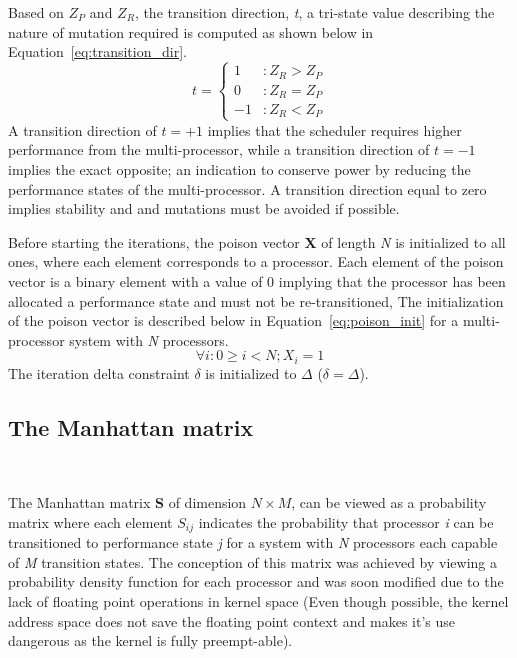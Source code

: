 Based on $Z_{P}$ and $Z_{R}$, the transition direction, \textit{t}, a tri-state value describing the nature of 
mutation required is computed as shown below in Equation~\eqref{eq:transition_dir}. 
\begin{equation}
    t = \left\{
     \begin{array}{lr}
       1 & : Z_{R} > Z_{P}\\
       0 & : Z_{R} = Z_{P} \\
       -1 & : Z_{R} < Z_{P}
     \end{array}
   \right.
\label{eq:transition_dir}
\end{equation}
A transition direction of $t = +1$ implies that the scheduler requires higher performance from
the multi-processor, while a transition direction of $t = -1$ implies the exact opposite; an indication
to conserve power by reducing the performance states of the multi-processor. A transition direction equal to zero
implies stability and and mutations must be avoided if possible. 

Before starting the iterations, the poison vector \textbf{X} of length \textit{N} is initialized to all ones, where
each element corresponds to a processor. Each element of the poison vector is a binary element with a value of 0 
implying that the processor has been allocated a performance state and must not be re-transitioned, The initialization
of the poison vector is described below in Equation~\eqref{eq:poison_init} for a multi-processor system with \textit{N} processors.
\begin{equation}
    \forall i : 0 \geq i < N; X_{i} = 1 
\label{eq:poison_init}
\end{equation}
The iteration delta constraint $\delta$ is initialized to $\Delta$  ($\delta = \Delta$). 

\subsection{The Manhattan matrix}~\label{sec:delta_matrix}

The Manhattan matrix \textbf{S} of dimension $N \times M$, can be viewed as a probability matrix where each element
$S_{ij}$ indicates the probability that processor \textit{i} can be transitioned to
performance state \textit{j} for a system with \textit{N} processors each 
capable of \textit{M} transition states. The conception of this matrix was achieved by viewing
a probability density function for each processor and was soon modified due to the lack of floating point operations in kernel space 
(Even though possible, the kernel address space does not save the floating point 
context and makes it's use dangerous as the kernel is fully preempt-able).

